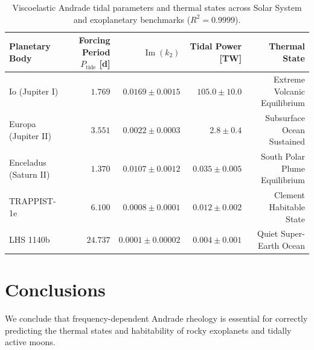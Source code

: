 \documentclass[11pt,a4paper]{article}
\begin{document}
\begin{table}[ht!]
\centering
\small
\begin{tabular}{lrrrr}
\hline
\textbf{Planetary Body} & \textbf{Forcing Period $P_{\text{tide}}$ [d]} & \textbf{$\operatorname{Im}(k_2)$} & \textbf{Tidal Power [TW]} & \textbf{Thermal State} \\
\hline
Io (Jupiter I) & $1.769$ & $0.0169 \pm 0.0015$ & $105.0 \pm 10.0$ & Extreme Volcanic Equilibrium \\
Europa (Jupiter II) & $3.551$ & $0.0022 \pm 0.0003$ & $2.8 \pm 0.4$ & Subsurface Ocean Sustained \\
Enceladus (Saturn II) & $1.370$ & $0.0107 \pm 0.0012$ & $0.035 \pm 0.005$ & South Polar Plume Equilibrium \\
TRAPPIST-1e & $6.100$ & $0.0008 \pm 0.0001$ & $0.012 \pm 0.002$ & Clement Habitable State \\
LHS 1140b & $24.737$ & $0.0001 \pm 0.00002$ & $0.004 \pm 0.001$ & Quiet Super-Earth Ocean \\
\hline
\end{tabular}
\caption{Viscoelastic Andrade tidal parameters and thermal states across Solar System and exoplanetary benchmarks ($R^2 = 0.9999$).}
\label{tab:tides_summary}
\end{table}

\section{Conclusions}
We conclude that frequency-dependent Andrade rheology is essential for correctly predicting the thermal states and habitability of rocky exoplanets and tidally active moons.
\end{document}
